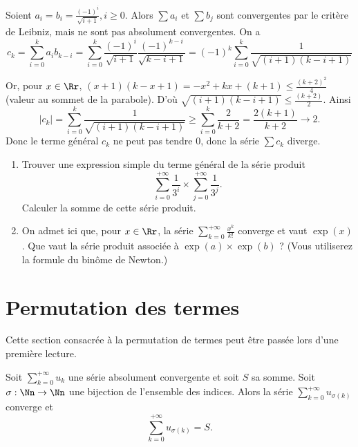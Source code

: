 \documentclass[class=report,crop=false]{standalone}
\begin{document}
\begin{exemple}
Soient $a_i=b_i=\frac{(-1)^{i}}{\sqrt {i+1}}, i\ge 0$.
Alors $\sum a_i$ et $\sum b_j$ sont convergentes par le critère de Leibniz, 
mais ne sont pas absolument convergentes. On a
$$c_k = \sum_{i=0}^k a_i b_{k-i} 
= \sum_{i=0}^k \frac{(-1)^{i}}{\sqrt {i+1}} \frac{(-1)^{k-i}}{\sqrt{k-i+1}} 
= (-1)^{k} \sum_{i=0}^k \frac{1}{\sqrt{(i+1)(k-i+1)}}$$

Or, pour $x\in\Rr$, $(x+1)(k-x+1)=-x^2+kx+(k+1) \le \frac{(k+2)^2}{4}$ (valeur au sommet de la parabole). 
D'o\`u $\sqrt{(i+1)(k-i+1)} \le \frac{(k+2)}{2}$.
Ainsi
$$|c_k|=\sum_{i=0}^k\frac{1}{\sqrt{(i+1)(k-i+1)}} \ge \sum_{i=0}^k \frac{2}{k+2} = \frac{2(k+1)}{k+2} \to 2.$$
Donc le terme général $c_k$ ne peut pas tendre $0$, donc la série $\sum c_k$ diverge.
\end{exemple}



\begin{miniexercices}
\begin{enumerate}
  \item Trouver une expression simple du terme général de la série produit
  $$\sum_{i=0}^{+\infty} \frac{1}{3^i} \times \sum_{j=0}^{+\infty} \frac{1}{3^j}.$$
  Calculer la somme de cette série produit.
  \item On admet ici que, pour $x\in \Rr$, la série $\sum_{k=0}^{+\infty} \frac{x^k}{k!}$ converge et vaut
  $\exp(x)$.
  Que vaut la série produit associée à $\exp(a) \times \exp(b)$ ?
  (Vous utiliserez la formule du binôme de Newton.)
\end{enumerate}
\end{miniexercices}

\section{Permutation des termes}


Cette section consacrée à la permutation de termes
peut être passée lors d'une première lecture.

\begin{theoreme}
Soit $\sum_{k=0}^{+\infty} u_k$ une série absolument convergente et soit $S$ sa somme.
Soit $\sigma : \Nn \to \Nn$ une bijection de l'ensemble des indices.
Alors la série $\displaystyle \sum_{k=0}^{+\infty} u_{\sigma(k)}$ converge
et $$\sum_{k=0}^{+\infty} u_{\sigma(k)} = S.$$
\end{theoreme}
\end{document}
